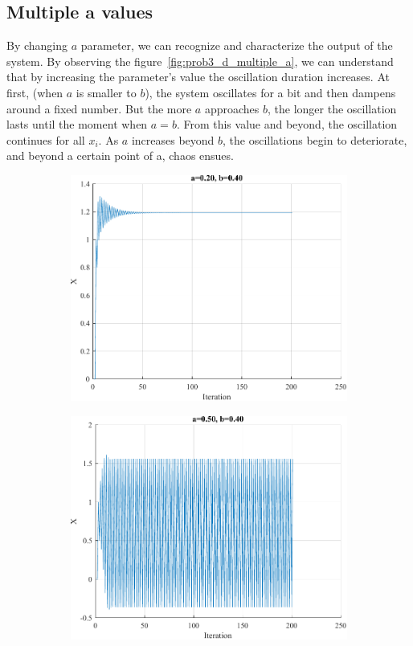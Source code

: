 \subsection{Multiple a values}

By changing $a$ parameter, we can recognize and characterize the output of the system. By observing the figure~\ref{fig:prob3_d_multiple_a}, we can understand that by increasing the parameter's value the oscillation duration increases. At first, (when $a$ is smaller to $b$), the system oscillates for a bit and then dampens around a fixed number. But the more $a$ approaches $b$, the longer the oscillation lasts until the moment when $a=b$.
From this value and beyond, the oscillation continues for all $x_i$. As $a$ increases beyond $b$, the oscillations begin to deteriorate, and beyond a certain point of a, chaos ensues.
\begin{figure}[H]
	\centering
	\begin{subfigure}{0.3\textwidth}
		\centering
		\includegraphics[width=\textwidth]{../Problem 3/prob3_(d)_a_0.20_b_0.40.pdf}
		\caption{}
	\end{subfigure}
	\begin{subfigure}{0.3\textwidth}
		\centering
		\includegraphics[width=\textwidth]{../Problem 3/prob3_(d)_a_0.50_b_0.40.pdf}

\end{subfigure}
\end{figure}
